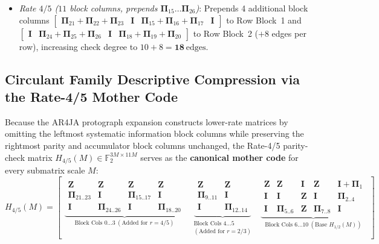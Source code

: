 \documentclass[10pt]{article}
\begin{document}
\begin{itemize}[leftmargin=1.8em, itemsep=2pt]
\begin{itemize}[leftmargin=1.5em, itemsep=1pt]
        \item \emph{Rate $4/5$ ($11$ block columns, prepends $\mathbf{\Pi}_{15} \dots \mathbf{\Pi}_{26}$)}: Prepends 4 additional block columns $\begin{bmatrix}\mathbf{\Pi}_{21}+\mathbf{\Pi}_{22}+\mathbf{\Pi}_{23} & \mathbf{I} & \mathbf{\Pi}_{15}+\mathbf{\Pi}_{16}+\mathbf{\Pi}_{17} & \mathbf{I}\end{bmatrix}$ to Row Block~1 and $\begin{bmatrix}\mathbf{I} & \mathbf{\Pi}_{24}+\mathbf{\Pi}_{25}+\mathbf{\Pi}_{26} & \mathbf{I} & \mathbf{\Pi}_{18}+\mathbf{\Pi}_{19}+\mathbf{\Pi}_{20}\end{bmatrix}$ to Row Block~2 ($+8$ edges per row), increasing check degree to $10 + 8 = \mathbf{18\ \mathrm{edges}}$.
    \end{itemize}
\end{itemize}

\subsection{Circulant Family Descriptive Compression via the Rate-4/5 Mother Code}

Because the AR4JA protograph expansion constructs lower-rate matrices by omitting the leftmost systematic information block columns while preserving the rightmost parity and accumulator block columns unchanged, the Rate-4/5 parity-check matrix $H_{4/5}(M) \in \mathbb{F}_2^{3M \times 11M}$ serves as the \textbf{canonical mother code} for every submatrix scale $M$:
\begin{equation}
\label{eq:mother_code_nesting}
H_{4/5}(M) = \left[\begin{array}{c|c|c}
\underbrace{\begin{matrix} \mathbf{Z} & \mathbf{Z} & \mathbf{Z} & \mathbf{Z} \\ \mathbf{\Pi}_{21..23} & \mathbf{I} & \mathbf{\Pi}_{15..17} & \mathbf{I} \\ \mathbf{I} & \mathbf{\Pi}_{24..26} & \mathbf{I} & \mathbf{\Pi}_{18..20} \end{matrix}}_{\text{Block Cols } 0 \dots 3\ (\text{Added for } r=4/5)} &
\underbrace{\begin{matrix} \mathbf{Z} & \mathbf{Z} \\ \mathbf{\Pi}_{9..11} & \mathbf{I} \\ \mathbf{I} & \mathbf{\Pi}_{12..14} \end{matrix}}_{\substack{\text{Block Cols } 4 \dots 5 \\ (\text{Added for } r=2/3)}} &
\underbrace{\begin{matrix} \mathbf{Z} & \mathbf{Z} & \mathbf{I} & \mathbf{Z} & \mathbf{I}+\mathbf{\Pi}_1 \\ \mathbf{I} & \mathbf{I} & \mathbf{Z} & \mathbf{I} & \mathbf{\Pi}_{2..4} \\ \mathbf{I} & \mathbf{\Pi}_{5..6} & \mathbf{Z} & \mathbf{\Pi}_{7..8} & \mathbf{I} \end{matrix}}_{\text{Block Cols } 6 \dots 10\ (\text{Base } H_{1/2}(M))}
\end{array}\right]
\end{equation}
\end{document}
